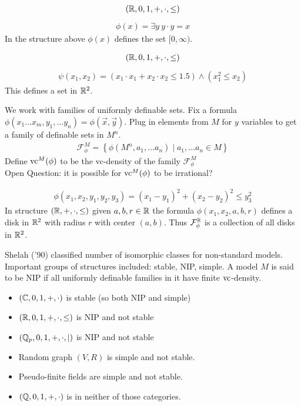 \documentclass{beamer}
\newcommand{\F}{\mathcal F}
\newcommand{\curly}[1]{\left\{ #1 \right\}}
\begin{document}
\begin{frame}
	\begin{align*}
		(\mathbb{R}, 0, 1, +, \cdot, \leq)
	\end{align*}
	\begin{align*}
		\phi(x) = \exists y \ y \cdot y = x
	\end{align*}
	In the structure above $\phi(x)$ defines the set $[0, \infty)$.
\end{frame}

\begin{frame}
	\begin{align*}
		(\mathbb{R}, 0, 1, +, \cdot, \leq)
	\end{align*}
	\begin{align*}
		\psi(x_1, x_2) = (x_1 \cdot x_1 + x_2 \cdot x_2 \leq 1.5) \wedge (x_1^2 \leq x_2)
	\end{align*}
	This defines a set in $\mathbb{R}^2$.
\end{frame}

\begin{frame}
	We work with families of uniformly definable sets.
	Fix a formula $\phi(x_1 \ldots x_m, y_1, \ldots y_n) = \phi(\vec x, \vec y)$.
	Plug in elements from $M$ for $y$ variables to get a family of definable sets in $M^n$.
	\begin{align*}
		\F^M_\phi = \curly{\phi(M^n, a_1, \ldots a_n) \mid a_1, \ldots a_n \in M}
	\end{align*}
	Define $\operatorname{vc}^M(\phi)$ to be the vc-density of the family $\F^M_\phi$ \\
	Open Question: it is possible for $\operatorname{vc}^M(\phi)$ to be irrational?
\end{frame}

\begin{frame}
	\begin{align*}
		\phi(x_1, x_2, y_1, y_2, y_3) = (x_1 - y_1)^2 + (x_2 - y_2)^2 \leq y_3^2
	\end{align*}
	In structure $(\mathbb{R}, +, \cdot, \leq)$ given $a,b,r \in \mathbb{R}$ the formula $\phi(x_1, x_2, a, b, r)$ defines a disk in $\mathbb{R}^2$ with radius $r$ with center $(a,b)$.
	Thus $\F^\R_\phi$ is a collection of all disks in $\mathbb{R}^2$.
\end{frame}

\begin{frame}
	Shelah ('90) classified number of isomorphic classes for non-standard models.
	Important groups of structures included: stable, NIP, simple.
	A model $M$ is said to be NIP if all uniformly definable families in it have finite $\operatorname{vc}$-density.
	\begin{itemize}
		\item $(\mathbb{C}, 0, 1, +, \cdot)$ is stable (so both NIP and simple)
		\item $(\mathbb{R}, 0, 1, +, \cdot, \leq)$ is NIP and not stable
		\item $(\mathbb{Q}_p, 0, 1, +, \cdot, \mid)$ is NIP and not stable
		\item Random graph $(V, R)$ is simple and not stable.
		\item Pseudo-finite fields are simple and not stable.
		\item $(\mathbb{Q}, 0, 1, +, \cdot)$ is in neither of those categories.
	\end{itemize}
\end{frame}
\end{document}
